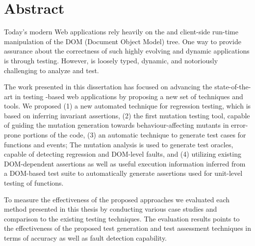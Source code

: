 
\chapter{Abstract}
Today's modern Web applications rely heavily on the \javascript and client-side run-time manipulation of the DOM (Document Object Model) tree. One way to provide assurance about the correctness of such highly evolving and dynamic applications is through testing. However, \javascript is loosely typed, dynamic, and notoriously challenging to analyze and test.

The work presented in this dissertation has focused on advancing the state-of-the-art in testing \javascript-based web applications by proposing a new set of techniques and tools. We proposed (1) a new automated technique for \javascript regression testing, which is based on inferring invariant assertions, (2) the first \javascript mutation testing tool, capable of guiding the mutation generation towards behaviour-affecting mutants in error-prone portions of the code, (3) an automatic technique to generate test cases for \javascript functions and events; The mutation analysis is used to generate test oracles, capable of detecting regression \javascript and DOM-level faults, and (4) utilizing existing DOM-dependent assertions as well as useful execution information inferred from a DOM-based test suite to automatically generate assertions used for unit-level testing of \javascript functions.

To measure the effectiveness of the proposed approaches we evaluated each method presented in this thesis by conducting various case studies and comparison to the existing testing techniques. The evaluation results points to the effectiveness of the proposed test generation and test assessment techniques in terms of accuracy as well as fault detection capability.


%
%

